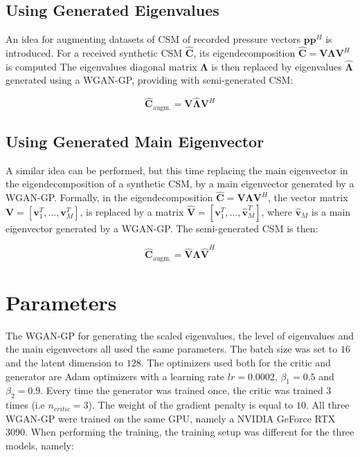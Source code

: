 \documentclass[11pt,a4paper,twoside]{report}
\begin{document}
\subsection{Using Generated Eigenvalues}

An idea for augmenting datasets of CSM of recorded pressure vectors $\mathbf{p} \mathbf{p}^H$ is introduced. For a received synthetic CSM $\mathbf{\hat{C}}$, its  eigendecomposition $\mathbf{\hat{C}} = \mathbf{V} \mathbf{\Lambda} \mathbf{V}^H$ is computed The eigenvalues diagonal matrix $ \mathbf{\Lambda}$ is then replaced by eigenvalues $\hat{\mathbf{\Lambda}}$ generated using a WGAN-GP, providing with semi-generated CSM:

\begin{equation}
    \mathbf{\hat{C}}_\text{augm.}  = \mathbf{V} \hat{\mathbf{\Lambda}} \mathbf{V}^H
\end{equation}

\subsection{Using Generated Main Eigenvector}

A similar idea can be performed, but this time replacing the main eigenvector in the eigendecomposition of a synthetic CSM, by a main eigenvector generated by a WGAN-GP. Formally, in the eigendecomposition $\mathbf{\hat{C}} = \mathbf{V} \mathbf{\Lambda} \mathbf{V}^H$, the vector matrix $\mathbf{V} = [\mathbf{v}_1^T, \dots, \mathbf{v}_M^T]$, is replaced by a matrix $\hat{\mathbf{V}} = [\mathbf{v}_1^T, \dots, \hat{\mathbf{v}}_M^T]$, where $\hat{\mathbf{v}}_M$ is a main eigenvector generated by a WGAN-GP. The semi-generated CSM is then:

\begin{equation}
    \mathbf{\hat{C}}_\text{augm.}  = \hat{\mathbf{V}} \mathbf{\Lambda} \hat{\mathbf{V}}^H
\end{equation}



\section{Parameters}

The WGAN-GP for generating the scaled eigenvalues, the level of eigenvalues and the main eigenvectors all used the same parameters. The batch size was set to $16$ and the latent dimension to $128$. The optimizers used both for the critic and generator are Adam optimizers with a learning rate $lr=0.0002$, $\beta_1=0.5$ and $\beta_2=0.9$. Every time the generator was trained once, the critic was trained 3 times (i.e $n_{critic} = 3$). The weight of the gradient penalty is equal to $10$. All three WGAN-GP were trained on the same GPU, namely a NVIDIA GeForce RTX 3090. When performing the training, the training setup was different for the three models, namely:
\end{document}

